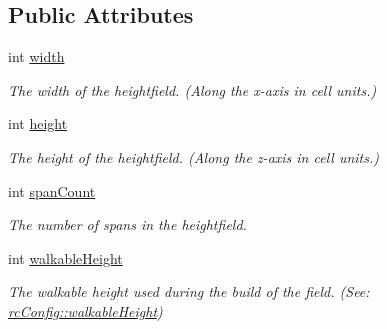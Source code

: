\subsection*{Public Attributes}
\begin{DoxyCompactItemize}
\item 
\mbox{\label{structrcCompactHeightfield_a98868c1df2523cd724696ed1d223ba13}} 
int \hyperlink{structrcCompactHeightfield_a98868c1df2523cd724696ed1d223ba13}{width}
\begin{DoxyCompactList}\small\item\em The width of the heightfield. (Along the x-\/axis in cell units.) \end{DoxyCompactList}\item 
\mbox{\label{structrcCompactHeightfield_a25d9e16e5d82cf698e47b18a5740b639}} 
int \hyperlink{structrcCompactHeightfield_a25d9e16e5d82cf698e47b18a5740b639}{height}
\begin{DoxyCompactList}\small\item\em The height of the heightfield. (Along the z-\/axis in cell units.) \end{DoxyCompactList}\item 
\mbox{\label{structrcCompactHeightfield_a7206a15efe8a9e2a8e28b8c7d89b45bd}} 
int \hyperlink{structrcCompactHeightfield_a7206a15efe8a9e2a8e28b8c7d89b45bd}{span\+Count}
\begin{DoxyCompactList}\small\item\em The number of spans in the heightfield. \end{DoxyCompactList}\item 
\mbox{\label{structrcCompactHeightfield_a04baed5c41b0e19e525e3136b138dc1a}} 
int \hyperlink{structrcCompactHeightfield_a04baed5c41b0e19e525e3136b138dc1a}{walkable\+Height}
\begin{DoxyCompactList}\small\item\em The walkable height used during the build of the field. (See\+: \hyperlink{structrcConfig_ab965b5f2aaa0b1ee7f91b28ead07c8c7}{rc\+Config\+::walkable\+Height}) \end{DoxyCompactList}\item 
\mbox{\label{structrcCompactHeightfield_ae403555331ef3d2624ca9433226bd683}} 

\end{DoxyCompactItemize}
